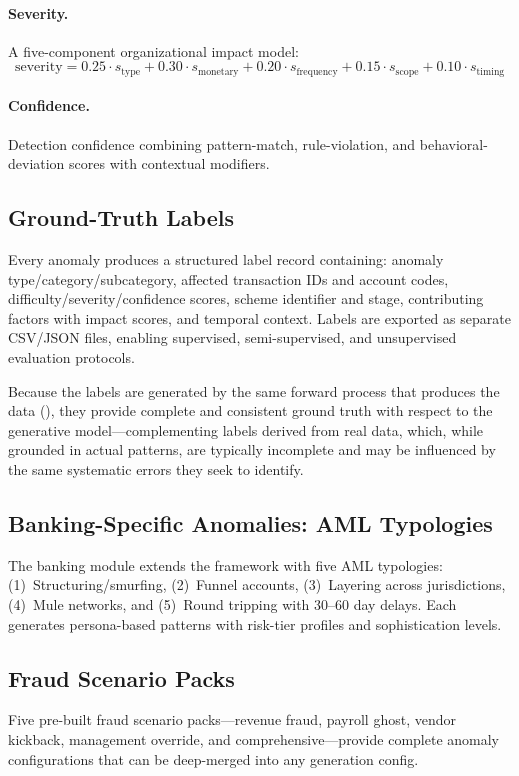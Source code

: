 \paragraph{Severity.}
A five-component organizational impact model:
\begin{equation}
\text{severity} = 0.25 \cdot s_{\text{type}} + 0.30 \cdot s_{\text{monetary}}
  + 0.20 \cdot s_{\text{frequency}} + 0.15 \cdot s_{\text{scope}}
  + 0.10 \cdot s_{\text{timing}}
\label{eq:severity}
\end{equation}

\paragraph{Confidence.}
Detection confidence combining pattern-match, rule-violation, and
behavioral-deviation scores with contextual modifiers.

\subsection{Ground-Truth Labels}
\label{sec:anom_labels}

Every anomaly produces a structured label record containing:
anomaly type/category/subcategory, affected transaction IDs and account
codes, difficulty/severity/confidence scores, scheme identifier and
stage, contributing factors with impact scores, and temporal context.
Labels are exported as separate CSV/JSON files, enabling supervised,
semi-supervised, and unsupervised evaluation protocols.

Because the labels are generated by the same forward process that
produces the data (), they provide
complete and consistent ground truth with respect to
the generative model---complementing labels derived from real data,
which, while grounded in actual patterns, are typically incomplete
and may be influenced by the same systematic errors they seek to
identify.

\subsection{Banking-Specific Anomalies: AML Typologies}
\label{sec:anom_aml}

The banking module extends the framework with five AML typologies:
(1)~Structuring/smurfing, (2)~Funnel accounts, (3)~Layering across
jurisdictions, (4)~Mule networks, and (5)~Round tripping with 30--60
day delays.  Each generates persona-based patterns with risk-tier
profiles and sophistication levels.

\subsection{Fraud Scenario Packs}
\label{sec:anom_fraud_packs}

Five pre-built fraud scenario packs---revenue fraud, payroll ghost,
vendor kickback, management override, and comprehensive---provide
complete anomaly configurations that can be deep-merged into any
generation config.
